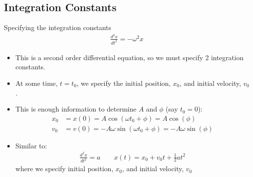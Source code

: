 \documentclass[aspectratio=169,
hyperref={colorlinks,urlcolor=blue}
]{beamer}
\begin{document}
\subsection{Integration Constants}
\label{subsec:integrationconstants}
\begin{frame}{Specifying the integration constants}
\begin{align*}
\frac{d^2x}{dt^2}=-\omega^2 x
\end{align*}
\begin{itemize}
\item This is a second order differential equation, so we must specify 2 integration constants.
\item At some time, $t=t_0$, we specify the initial position, $x_0$, and initial velocity, $v_0$.
\item This is enough information to determine $A$ and $\phi$  (say $t_0=0$):
\begin{align*}
x_0&=x(0)=A\cos(\omega t_0 +\phi)=A\cos(\phi)\\
v_0&=v(0)=-A\omega\sin(\omega t_0 +\phi)=-A\omega\sin(\phi)
\end{align*}
\item Similar to:
\begin{align*}
\frac{d^2x}{dt^2}=a \quad\quad x(t)=x_0+v_0t+\frac{1}{2}at^2
\end{align*}
where we specify initial position, $x_0$, and initial velocity, $v_0$
\end{itemize}

\end{frame}







\end{document}
